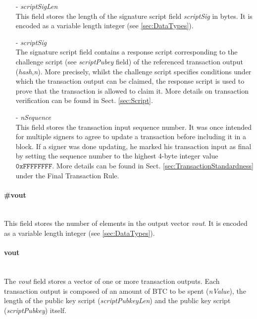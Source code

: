 \begin{itemize}
\item[-] \textit{scriptSigLen}~\\
This field stores the length of the signature script field \textit{scriptSig} in bytes. It is encoded as a variable length integer (see \ref{sec:DataTypes}).

\item[-] \textit{scriptSig}~\\
The signature script field contains a response script corresponding to the challenge script (see \textit{scriptPubey} field) of the referenced transaction output (\textit{hash},\textit{n}). More precisely, whilst the challenge script specifies conditions under which the transaction output can be claimed, the response script is used to prove that the transaction is allowed to claim it. More details on transaction verification can be found in Sect. \ref{sec:Script}.

\item[-] \textit{nSequence}~\\
This field stores the transaction input sequence number. It was once intended for multiple signers to agree to update a transaction before including it in a block. If a signer was done updating, he marked his transaction input as final by setting the sequence number to the highest 4-byte integer value $\texttt{0xFFFFFFFF}$. More details can be found in Sect. \ref{sec:TransactionStandardness} under the Final Transaction Rule.
\end{itemize}

\paragraph{\#vout}~\\
This field stores the number of elements in the output vector \textit{vout}. It is encoded as a variable length integer (see \ref{sec:DataTypes}).

\paragraph{vout}~\\
The \textit{vout} field stores a vector of one or more transaction outputs. Each transaction output is composed of an amount of BTC to be spent (\textit{nValue}), the length of the public key script (\textit{scriptPubkeyLen}) and the public key script (\textit{scriptPubkey}) itself.

